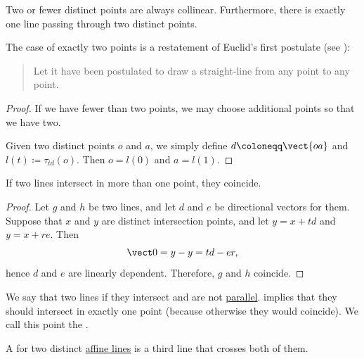 \begin{proposition}\label{thm:pair_of_points_is_collinear}
  Two or fewer distinct points are always collinear. Furthermore, there is exactly one line passing through two distinct points.

  The case of exactly two points is a restatement of Euclid's first postulate (see \cite[7]{Euclid2008Elements}):
  \begin{quote}
    Let it have been postulated to draw a straight-line from any point to any point.
  \end{quote}
\end{proposition}
\begin{proof}
  If we have fewer than two points, we may choose additional points so that we have two.

  Given two distinct points \( o \) and \( a \), we simply define \( d \coloneqq \vect{oa} \) and \( l(t) \coloneqq \tau_{td}(o) \). Then \( o = l(0) \) and \( a = l(1) \).
\end{proof}

\begin{proposition}\label{thm:crossing_lines}
  If two lines intersect in more than one point, they coincide.
\end{proposition}
\begin{proof}
  Let \( g \) and \( h \) be two lines, and let \( d \) and \( e \) be directional vectors for them. Suppose that \( x \) and \( y \) are distinct intersection points, and let \( y = x + td \) and \( y = x + re \). Then
  \begin{equation*}
    \vect 0 = y - y = td - er,
  \end{equation*}
  hence \( d \) and \( e \) are linearly dependent. Therefore, \( g \) and \( h \) coincide.
\end{proof}

\begin{definition}\label{def:crossing_lines}
  We say that two lines  if they intersect and are not \hyperref[def:affine_parallelism]{parallel}.  implies that they should intersect in exactly one point (because otherwise they would coincide). We call this point the .
\end{definition}

\begin{definition}\label{def:transversal_line}\mimprovised
  A  for two distinct \hyperref[def:affine_line]{affine lines} is a third line that crosses both of them.
\end{definition}


